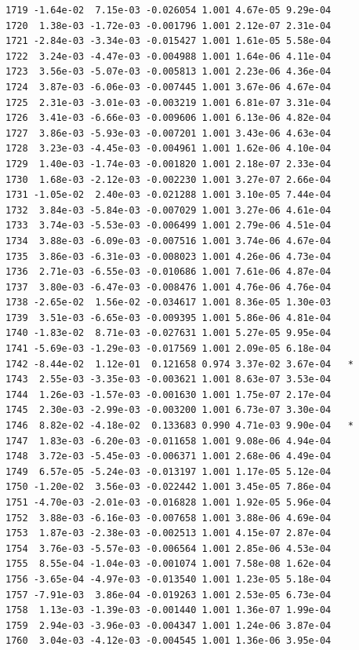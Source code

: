 \documentclass[
  letterpaper,
  DIV=11,
  numbers=noendperiod]{scrartcl}
\begin{document}
\begin{verbatim}
1719 -1.64e-02  7.15e-03 -0.026054 1.001 4.67e-05 9.29e-04    
1720  1.38e-03 -1.72e-03 -0.001796 1.001 2.12e-07 2.31e-04    
1721 -2.84e-03 -3.34e-03 -0.015427 1.001 1.61e-05 5.58e-04    
1722  3.24e-03 -4.47e-03 -0.004988 1.001 1.64e-06 4.11e-04    
1723  3.56e-03 -5.07e-03 -0.005813 1.001 2.23e-06 4.36e-04    
1724  3.87e-03 -6.06e-03 -0.007445 1.001 3.67e-06 4.67e-04    
1725  2.31e-03 -3.01e-03 -0.003219 1.001 6.81e-07 3.31e-04    
1726  3.41e-03 -6.66e-03 -0.009606 1.001 6.13e-06 4.82e-04    
1727  3.86e-03 -5.93e-03 -0.007201 1.001 3.43e-06 4.63e-04    
1728  3.23e-03 -4.45e-03 -0.004961 1.001 1.62e-06 4.10e-04    
1729  1.40e-03 -1.74e-03 -0.001820 1.001 2.18e-07 2.33e-04    
1730  1.68e-03 -2.12e-03 -0.002230 1.001 3.27e-07 2.66e-04    
1731 -1.05e-02  2.40e-03 -0.021288 1.001 3.10e-05 7.44e-04    
1732  3.84e-03 -5.84e-03 -0.007029 1.001 3.27e-06 4.61e-04    
1733  3.74e-03 -5.53e-03 -0.006499 1.001 2.79e-06 4.51e-04    
1734  3.88e-03 -6.09e-03 -0.007516 1.001 3.74e-06 4.67e-04    
1735  3.86e-03 -6.31e-03 -0.008023 1.001 4.26e-06 4.73e-04    
1736  2.71e-03 -6.55e-03 -0.010686 1.001 7.61e-06 4.87e-04    
1737  3.80e-03 -6.47e-03 -0.008476 1.001 4.76e-06 4.76e-04    
1738 -2.65e-02  1.56e-02 -0.034617 1.001 8.36e-05 1.30e-03    
1739  3.51e-03 -6.65e-03 -0.009395 1.001 5.86e-06 4.81e-04    
1740 -1.83e-02  8.71e-03 -0.027631 1.001 5.27e-05 9.95e-04    
1741 -5.69e-03 -1.29e-03 -0.017569 1.001 2.09e-05 6.18e-04    
1742 -8.44e-02  1.12e-01  0.121658 0.974 3.37e-02 3.67e-04   *
1743  2.55e-03 -3.35e-03 -0.003621 1.001 8.63e-07 3.53e-04    
1744  1.26e-03 -1.57e-03 -0.001630 1.001 1.75e-07 2.17e-04    
1745  2.30e-03 -2.99e-03 -0.003200 1.001 6.73e-07 3.30e-04    
1746  8.82e-02 -4.18e-02  0.133683 0.990 4.71e-03 9.90e-04   *
1747  1.83e-03 -6.20e-03 -0.011658 1.001 9.08e-06 4.94e-04    
1748  3.72e-03 -5.45e-03 -0.006371 1.001 2.68e-06 4.49e-04    
1749  6.57e-05 -5.24e-03 -0.013197 1.001 1.17e-05 5.12e-04    
1750 -1.20e-02  3.56e-03 -0.022442 1.001 3.45e-05 7.86e-04    
1751 -4.70e-03 -2.01e-03 -0.016828 1.001 1.92e-05 5.96e-04    
1752  3.88e-03 -6.16e-03 -0.007658 1.001 3.88e-06 4.69e-04    
1753  1.87e-03 -2.38e-03 -0.002513 1.001 4.15e-07 2.87e-04    
1754  3.76e-03 -5.57e-03 -0.006564 1.001 2.85e-06 4.53e-04    
1755  8.55e-04 -1.04e-03 -0.001074 1.001 7.58e-08 1.62e-04    
1756 -3.65e-04 -4.97e-03 -0.013540 1.001 1.23e-05 5.18e-04    
1757 -7.91e-03  3.86e-04 -0.019263 1.001 2.53e-05 6.73e-04    
1758  1.13e-03 -1.39e-03 -0.001440 1.001 1.36e-07 1.99e-04    
1759  2.94e-03 -3.96e-03 -0.004347 1.001 1.24e-06 3.87e-04    
1760  3.04e-03 -4.12e-03 -0.004545 1.001 1.36e-06 3.95e-04    

\end{verbatim}
\end{document}
